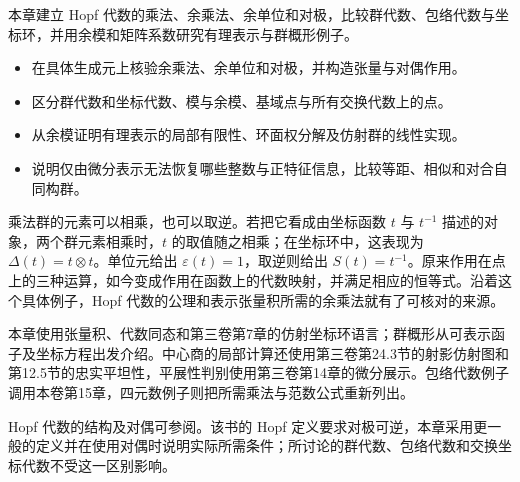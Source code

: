 

\begin{chapterabstract}
	本章建立 Hopf 代数的乘法、余乘法、余单位和对极，比较群代数、包络代数与坐标环，并用余模和矩阵系数研究有理表示与群概形例子。
\end{chapterabstract}

\begin{learninggoals}
	\begin{itemize}
		\item 在具体生成元上核验余乘法、余单位和对极，并构造张量与对偶作用。
		\item 区分群代数和坐标代数、模与余模、基域点与所有交换代数上的点。
		\item 从余模证明有理表示的局部有限性、环面权分解及仿射群的线性实现。
		\item 说明仅由微分表示无法恢复哪些整数与正特征信息，比较等距、相似和对合自同构群。
	\end{itemize}
\end{learninggoals}

乘法群的元素可以相乘，也可以取逆。若把它看成由坐标函数 \(t\) 与 \(t^{-1}\) 描述的对象，两个群元素相乘时，\(t\) 的取值随之相乘；在坐标环中，这表现为 \(\Delta(t)=t\otimes t\)。单位元给出 \(\varepsilon(t)=1\)，取逆则给出 \(S(t)=t^{-1}\)。原来作用在点上的三种运算，如今变成作用在函数上的代数映射，并满足相应的恒等式。沿着这个具体例子，Hopf 代数的公理和表示张量积所需的余乘法就有了可核对的来源。

\ProseParagraphBreak
本章使用张量积、代数同态和第三卷第7章的仿射坐标环语言；群概形从可表示函子及坐标方程出发介绍。中心商的局部计算还使用第三卷第24.3节的射影仿射图和第12.5节的忠实平坦性，平展性判别使用第三卷第14章的微分展示。包络代数例子调用本卷第15章，四元数例子则把所需乘法与范数公式重新列出。

\ProseParagraphBreak
Hopf 代数的结构及对偶可参阅\cite[Sections 5.2--5.3]{EtingofEtAl2015TensorCategories}。该书的 Hopf 定义要求对极可逆，本章采用更一般的定义并在使用对偶时说明实际所需条件；所讨论的群代数、包络代数和交换坐标代数不受这一区别影响。







